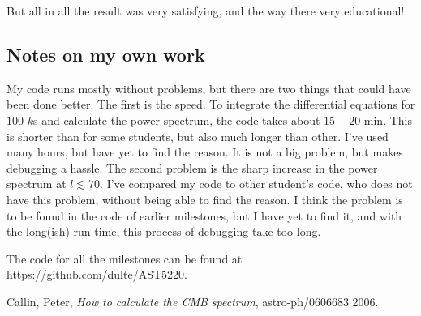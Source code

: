 \documentclass[a4paper,norsk, 10pt]{article}
\begin{document}
But all in all the result was very satisfying, and the way there very educational!


\subsection{Notes on my own work}
My code runs mostly without problems, but there are two things that could have been done better. The first is the speed. To integrate the differential equations for $100$ $k$s and calculate the power spectrum, the code takes about $15-20$ min. This is shorter than for some students, but also much longer than other. I've used many hours, but have yet to find the reason. It is not a big problem, but makes debugging a hassle. The second problem is the sharp increase in the power spectrum at $l\lesssim 70$. I've compared my code to other student's code, who does not have this problem, without being able to find the reason. I think the problem is to be found in the code of earlier milestones, but I have yet to find it, and with the long(ish) run time, this process of debugging take too long.

The code for all the milestones can be found at \url{https://github.com/dulte/AST5220}.

\begin{thebibliography}{9}

  Callin, Peter,
  \textit{How to calculate the CMB spectrum},
  astro-ph/0606683
  2006.

\end{thebibliography}
\end{document}
